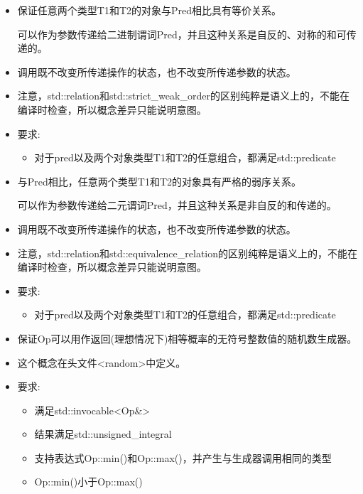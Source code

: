 
\begin{itemize}
\item
保证任意两个类型T1和T2的对象与Pred相比具有等价关系。

可以作为参数传递给二进制谓词Pred，并且这种关系是自反的、对称的和可传递的。

\item
调用既不改变所传递操作的状态，也不改变所传递参数的状态。

\item
注意，std::relation和std::strict\_weak\_order的区别纯粹是语义上的，不能在编译时检查，所以概念差异只能说明意图。

\item
要求:
\begin{itemize}
\item
对于pred以及两个对象类型T1和T2的任意组合，都满足std::predicate
\end{itemize}
\end{itemize}


\begin{itemize}
\item
与Pred相比，任意两个类型T1和T2的对象具有严格的弱序关系。

可以作为参数传递给二元谓词Pred，并且这种关系是非自反的和传递的。

\item
调用既不改变所传递操作的状态，也不改变所传递参数的状态。

\item
注意，std::relation和std::equivalence\_relation的区别纯粹是语义上的，不能在编译时检查，所以概念差异只能说明意图。

\item
要求:
\begin{itemize}
\item
对于pred以及两个对象类型T1和T2的任意组合，都满足std::predicate
\end{itemize}
\end{itemize}


\begin{itemize}
\item
保证Op可以用作返回(理想情况下)相等概率的无符号整数值的随机数生成器。

\item
这个概念在头文件<random>中定义。

\item
要求:
\begin{itemize}
\item
满足std::invocable<Op\&>

\item
结果满足std::unsigned\_integral

\item
支持表达式Op::min()和Op::max()，并产生与生成器调用相同的类型

\item
Op::min()小于Op::max()
\end{itemize}
\end{itemize}

